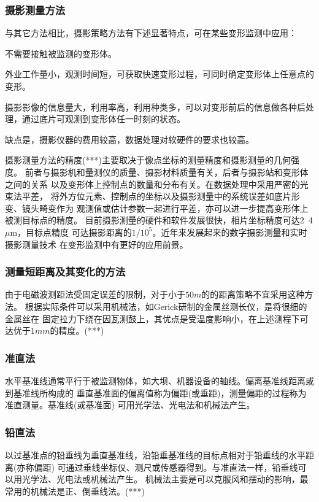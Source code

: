 \subsubsection*{摄影测量方法}
与其它方法相比，摄影策略方法有下述显著特点，可在某些变形监测中应用：
\begin{asparaitem}[$\bullet$]
\item 不需要接触被监测的变形体。
\item 外业工作量小，观测时间短，可获取快速变形过程，可同时确定变形体上任意点的变形。
\item 摄影影像的信息量大，利用率高，利用种类多，可以对变形前后的信息做各种后处理，通过底片可观测到变形体任一时刻的状态。
\item 缺点是，摄影仪器的费用较高，数据处理对软硬件的要求也较高。
\end{asparaitem}
摄影测量方法的精度(***)主要取决于像点坐标的测量精度和摄影测量的几何强度。
前者与摄影机和量测仪的质量、摄影材料质量有关，后者与摄影站和变形体之间的关系
以及变形体上控制点的数量和分布有关。在数据处理中采用严密的光束法平差，
将外方位元素、控制点的坐标以及摄影测量中的系统误差如底片形变、镜头畸变作为
观测值或估计参数一起进行平差，亦可以进一步提高变形体上被测目标点的精度。
目前摄影测量的硬件和软件发展很快，相片坐标精度可达2~4${\mu}$m，目标点精度
可达摄影距离的${1/10^5}$。近年来发展起来的数字摄影测量和实时摄影测量技术
在变形监测中有更好的应用前景。
\subsubsection*{测量短距离及其变化的方法}
由于电磁波测距法受固定误差的限制，对于小于$50m$的的距离策略不宜采用这种方法。
根据实际条件可以采用机械法，如Gerick研制的金属丝测长仪，是将很细的金属丝在
固定拉力下绕在因瓦测鼓上，其优点是受温度影响小，在上述测程下可达优于$1mm$的精度。(***)
\subsubsection*{准直法}
水平基准线通常平行于被监测物体，如大坝、机器设备的轴线。偏离基准线距离或到基准线所构成的
垂直基准面的偏离值称为偏距(或垂距)，测量偏距的过程称为准直测量。基准线(或基准面)
可用光学法、光电法和机械法产生。
\subsubsection*{铅直法}
以过基准点的铅垂线为垂直基准线，沿铅垂基准线的目标点相对于铅垂线的水平距离(亦称偏距)
可通过垂线坐标仪、测尺或传感器得到。与准直法一样，铅垂线可以用光学法、光电法或机械法产生。
机械法主要是可以克服风和摆动的影响，最常用的机械法是正、倒垂线法。(***)
